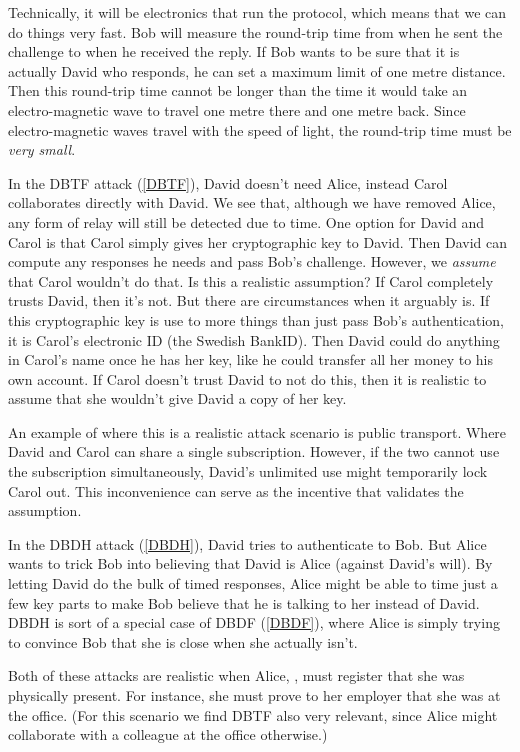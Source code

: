 Technically, it will be electronics that run the protocol, which means that we 
can do things very fast.
Bob will measure the round-trip time from when he sent the challenge to when he 
received the reply.
If Bob wants to be sure that it is actually David who responds, he can set a 
maximum limit of \eg one metre distance.
Then this round-trip time cannot be longer than the time it would take an 
electro-magnetic wave to travel one metre there and one metre back.
Since electro-magnetic waves travel with the speed of light, the round-trip 
time must be \emph{very small}.

In the \ac{DBTF} attack (\cref{DBTF}), David doesn't need Alice, instead Carol 
collaborates directly with David.
We see that, although we have removed Alice, any form of relay will still be 
detected due to time.
One option for David and Carol is that Carol simply gives her cryptographic key 
to David.
Then David can compute any responses he needs and pass Bob's challenge.
However, we \emph{assume} that Carol wouldn't do that.
Is this a realistic assumption?
If Carol completely trusts David, then it's not.
But there are circumstances when it arguably is.
If this cryptographic key is use to more things than just pass Bob's 
authentication, \eg it is Carol's electronic ID (\eg the Swedish BankID).
Then David could do anything in Carol's name once he has her key, like he could 
transfer all her money to his own account.
If Carol doesn't trust David to not do this, then it is realistic to assume 
that she wouldn't give David a copy of her key.

An example of where this is a realistic attack scenario is public transport.
Where David and Carol can share a single subscription.
However, if the two cannot use the subscription simultaneously, David's 
unlimited use might temporarily lock Carol out.
This inconvenience can serve as the incentive that validates the assumption.

In the \ac{DBDH} attack (\cref{DBDH}), David tries to authenticate to Bob.
But Alice wants to trick Bob into believing that David is Alice (against 
David's will).
By letting David do the bulk of timed responses, Alice might be able to time 
just a few key parts to make Bob believe that he is talking to her instead of 
David.
\Ac{DBDH} is sort of a special case of \ac{DBDF} (\cref{DBDF}), where Alice is 
simply trying to convince Bob that she is close when she actually isn't.

Both of these attacks are realistic when Alice, \eg, must register that she was 
physically present.
For instance, she must prove to her employer that she was at the office.
(For this scenario we find \ac{DBTF} also very relevant, since Alice might 
collaborate with a colleague at the office otherwise.)

